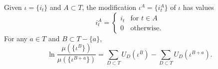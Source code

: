 Given $\iota = \{i_t\}$ and $A \subset T$, the modification $\iota^A = \{i_t^A\}$ of $\iota$ has values
$$i_t^A = \begin{cases} i_t & \text{for } t \in A \\ 0 & \text{otherwise.} \end{cases}$$
For any $a \in T$ and $B \subset T - \{a\}$,
$$\ln \frac{\mu(\{\iota^B\})}{\mu(\{\iota^{B+a}\})} = \sum_{D \subset T} U_D(\iota^B) - \sum_{D \subset T} U_D(\iota^{B+a}).$$
